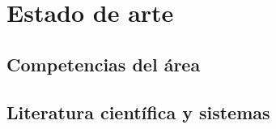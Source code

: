\chapter{Estado de arte}
\section{Competencias del área}
\section{Literatura científica y sistemas}





